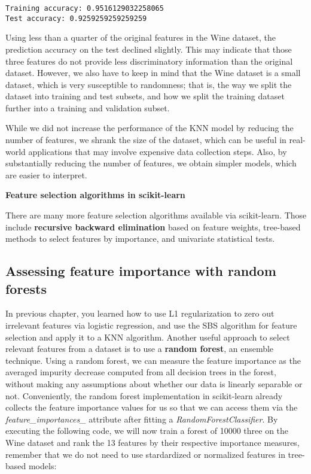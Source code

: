 \documentclass[11pt]{article}
\begin{document}
    \begin{Verbatim}[commandchars=\\\{\}]
Training accuracy: 0.9516129032258065
Test accuracy: 0.9259259259259259

    \end{Verbatim}

    Using less than a quarter of the original features in the Wine dataset,
the prediction accuracy on the test declined slightly. This may indicate
that those three features do not provide less discriminatory information
than the original dataset. However, we also have to keep in mind that
the Wine dataset is a small dataset, which is very susceptible to
randomness; that is, the way we split the dataset into training and test
subsets, and how we split the training dataset further into a training
and validation subset.

While we did not increase the performance of the KNN model by reducing
the number of features, we shrank the size of the dataset, which can be
useful in real-world applications that may involve expensive data
collection steps. Also, by substantially reducing the number of
features, we obtain simpler models, which are easier to interpret.

\textbf{Feature selection algorithms in scikit-learn}

There are many more feature selection algorithms available via
scikit-learn. Those include \textbf{recursive backward elimination}
based on feature weights, tree-based methods to select features by
importance, and univariate statistical tests.

    \subsection{Assessing feature importance with random
forests}\label{assessing-feature-importance-with-random-forests}

    In previous chapter, you learned how to use L1 regularization to zero
out irrelevant features via logistic regression, and use the SBS
algorithm for feature selection and apply it to a KNN algorithm. Another
useful approach to select relevant features from a dataset is to use a
\textbf{random forest}, an ensemble technique. Using a random forest, we
can measure the feature importance as the averaged impurity decrease
computed from all decision trees in the forest, without making any
assumptions about whether our data is linearly separable or not.
Conveniently, the random forest implementation in scikit-learn already
collects the feature importance values for us so that we can access them
via the \emph{feature\_importances\_} attribute after fitting a
\emph{RandomForestClassifier}. By executing the following code, we will
now train a forest of 10000 three on the Wine dataset and rank the 13
features by their respective importance measures, remember that we do
not need to use stardardized or normalized features in tree-based
models:
\end{document}
